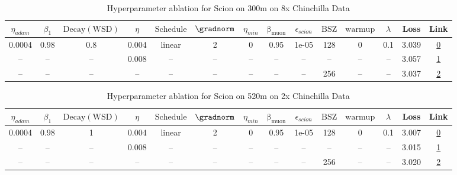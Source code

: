 \begin{table}[H]
\centering
\caption{Hyperparameter ablation for Scion on 300m on 8x Chinchilla Data}
\label{tab:ablation_scion_300m_on_8x_chinchilla_data}
\begin{tabular}{cccccccccccccc}
\toprule
$\eta_{adam}$ & $\beta_1$ & $\mathrm{Decay (WSD)}$ & $\eta$ & $\mathrm{Schedule}$ & $\gradnorm$ & $\eta_{min}$ & $\mathrm{\beta_{muon}}$ & $\epsilon_{scion}$ & $\mathrm{BSZ}$ & $\mathrm{warmup}$ & $\lambda$ & Loss & Link \\
\midrule
0.0004 & 0.98 & 0.8 & 0.004 & linear & 2 & 0 & 0.95 & 1e-05 & 128 & 0 & 0.1 & 3.039 & \href{https://wandb.ai/stanford-mercury/optimizer-scaling/runs/sweep-300m-48B-scion0ebd9blr0.004-wd0.1-minlr0-warmup0-b10.98-gn-c7b0e6}{0} \\
\midrule
-- & -- & -- & 0.008 & -- & -- & -- & -- & -- & -- & -- & -- & 3.057 & \href{https://wandb.ai/stanford-mercury/optimizer-scaling/runs/sweep-300m-48B-scion60ecb7lr0.008-wd0.1-minlr0-warmup0-b10.98-gn-da458a}{1} \\
-- & -- & -- & -- & -- & -- & -- & -- & -- & 256 & -- & -- & 3.037 & \href{https://wandb.ai/stanford-mercury/optimizer-scaling/runs/sweep-300m-48B-scione51587lr0.004-wd0.1-minlr0-warmup0-b10.98-gn-55b3ad}{2} \\
\bottomrule
\end{tabular}
\end{table}

\begin{table}[H]
\centering
\caption{Hyperparameter ablation for Scion on 520m on 2x Chinchilla Data}
\label{tab:ablation_scion_520m_on_2x_chinchilla_data}
\begin{tabular}{cccccccccccccc}
\toprule
$\eta_{adam}$ & $\beta_1$ & $\mathrm{Decay (WSD)}$ & $\eta$ & $\mathrm{Schedule}$ & $\gradnorm$ & $\eta_{min}$ & $\mathrm{\beta_{muon}}$ & $\epsilon_{scion}$ & $\mathrm{BSZ}$ & $\mathrm{warmup}$ & $\lambda$ & Loss & Link \\
\midrule
0.0004 & 0.98 & 1 & 0.004 & linear & 2 & 0 & 0.95 & 1e-05 & 128 & 0 & 0.1 & 3.007 & \href{https://wandb.ai/stanford-mercury/optimizer-scaling/runs/sweep-520m-21B-scioni268e92lr0.004-wd0.1-minlr0-warmup0-b10.98-g-a22c53}{0} \\
\midrule
-- & -- & -- & 0.008 & -- & -- & -- & -- & -- & -- & -- & -- & 3.015 & \href{https://wandb.ai/stanford-mercury/optimizer-scaling/runs/sweep-520m-21B-scioni941d43lr0.008-wd0.1-minlr0-warmup0-b10.98-g-7f3250}{1} \\
-- & -- & -- & -- & -- & -- & -- & -- & -- & 256 & -- & -- & 3.020 & \href{https://wandb.ai/stanford-mercury/optimizer-scaling/runs/sweep-520m-21B-scioni310e59lr0.004-wd0.1-minlr0-warmup0-b10.98-g-d42b8b}{2} \\
\bottomrule
\end{tabular}
\end{table}

